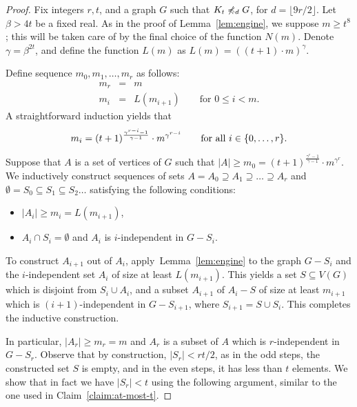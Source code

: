 \begin{proof}
  Fix integers $r,t$, and a graph $G$ such that $K_t\not\preccurlyeq_{d} G$,
  for $d=\lfloor 9r/2 \rfloor$. Let $\beta>4t$ be a fixed real. As in
  the proof of Lemma~\ref{lem:engine}, we suppose $m\geq t^8$; this
  will be taken care of by the final choice of the function $N(m)$.
  Denote $\gamma=\beta^{2t}$, and define the function $L(m)$ as
  $L(m)=((t+1)\cdot m)^\gamma$.

  Define sequence $m_0,m_1,\ldots,m_r$ as follows:
\begin{eqnarray*}
  m_r & = & m\\
  m_i & = & L(m_{i+1}) \qquad \textrm{for }0\leq i<m.
\end{eqnarray*}
A straightforward induction yields that
\begin{equation*}
  m_i=(t+1)^{\frac{\gamma^{r-i}-1}{\gamma-1}}\cdot m^{\gamma^{r-i}}\qquad \textrm{for all }i\in \{0,\ldots,r\}.
\end{equation*}

Suppose that $A$ is a set of vertices of $G$ such that
$|A|\ge m_0=(t+1)^{\frac{\gamma^{r}-1}{\gamma-1}}\cdot
m^{\gamma^{r}}$.
We inductively construct sequences of sets
$A= A_0\supseteq A_1\supseteq \ldots \supseteq A_r$ and
$\emptyset=S_0\subseteq S_1\subseteq S_2\ldots$ satisfying the
following conditions:
\begin{itemize}
\item $|A_i|\ge m_i=L(m_{i+1})$,
\item $A_i\cap S_i=\emptyset$ and $A_i$ is $i$-independent in $G-S_i$.
\end{itemize}
To construct $A_{i+1}$ out of $A_i$, apply~Lemma~\ref{lem:engine} to
the graph $G-S_i$ and the $i$-independent set $A_i$ of size at least
$L(m_{i+1})$. This yields a set $S\subseteq V(G)$ which is disjoint
from $S_i\cup A_i$, and a subset $A_{i+1}$ of $A_i-S$ of size at least
$m_{i+1}$ which is $(i+1)$-independent in $G-S_{i+1}$, where
$S_{i+1}=S\cup S_i$. This completes the inductive construction.

In particular, $|A_r|\ge m_r=m$ and $A_r$ is a subset of $A$ which is
$r$-independent in $G-S_r$.  Observe that by construction,
$|S_r|<r t/2$, as in the odd steps, the constructed set $S$ is empty,
and in the even steps, it has less than $t$ elements.  We show that in
fact we have $|S_r|<t$ using the following argument, similar to the
one used in Claim~\ref{claim:at-most-t}.


\end{proof}
